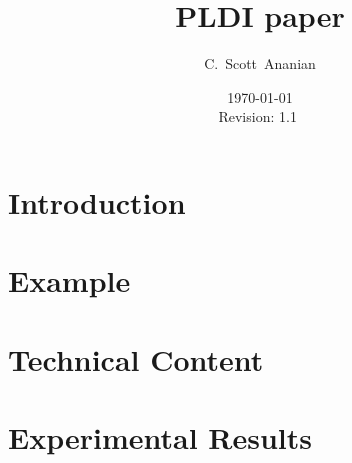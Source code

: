 \documentclass[notitlepage,twocolumn,twoside]{article}
\author{C.~Scott~Ananian}
\title{PLDI paper}
\date{\today \\ $ $Revision: 1.1 $ $}
\begin{document}

\maketitle

\section{Introduction}

\section{Example}

\section{Technical Content}

\section{Experimental Results}

\nocite{*}

\end{document}
